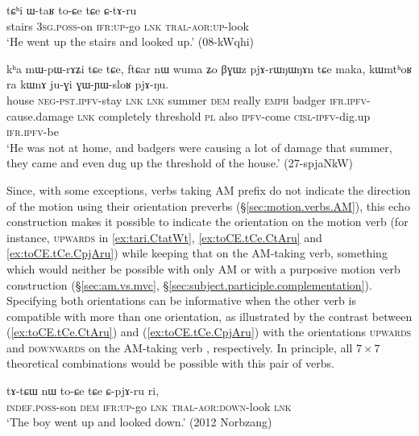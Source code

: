 \begin{exe}
\ex \label{ex:toCE.tCe.CtAru}
\gll tɕʰi ɯ-taʁ to-ɕe tɕe ɕ-tɤ-ru   \\
stairs \textsc{3sg}.\textsc{poss}-on \textsc{ifr}:\textsc{up}-go \textsc{lnk}  \textsc{tral}-\textsc{aor}:\textsc{up}-look \\
\glt `He went up the stairs and looked up.'  (08-kWqhi)
\end{exe}

\begin{exe}
\ex \label{ex:GWYWsloR}
\gll kʰa mɯ-pɯ-rɤʑi tɕe tɕe, ftɕar nɯ wuma ʑo βɣɯz pjɤ-rɯŋɯŋɤn tɕe maka, kɯmtʰoʁ ra kɯnɤ ju-ɣi ɣɯ-ɲɯ-sloʁ pjɤ-ŋu. \\
house \textsc{neg}-\textsc{pst}.\textsc{ipfv}-stay \textsc{lnk} \textsc{lnk} summer \textsc{dem} really \textsc{emph} badger \textsc{ifr}.\textsc{ipfv}-cause.damage \textsc{lnk} completely threshold \textsc{pl} also \textsc{ipfv}-come \textsc{cisl}-\textsc{ipfv}-dig.up \textsc{ifr}.\textsc{ipfv}-be \\
\glt `He was not at home, and badgers were causing a lot of damage that summer, they came and even dug up the threshold of the house.'  (27-spjaNkW)
\end{exe}

Since, with some exceptions, verbs taking AM prefix do not indicate the direction of the motion using their orientation preverbs (§\ref{sec:motion.verbs.AM}), this echo construction makes it possible to indicate the orientation on the motion verb (for instance, \textsc{upwards} in \ref{ex:tari.CtatWt}, \ref{ex:toCE.tCe.CtAru} and \ref{ex:toCE.tCe.CpjAru}) while keeping that on the AM-taking verb, something which would neither be possible with only AM or with a purposive motion verb construction (§\ref{sec:am.vs.mvc}, §\ref{sec:subject.participle.complementation}). Specifying both orientations can be informative when the other verb is compatible with more than one orientation, as illustrated by the contrast between (\ref{ex:toCE.tCe.CtAru}) and (\ref{ex:toCE.tCe.CpjAru}) with the orientations \textsc{upwards} and \textsc{downwards} on the AM-taking verb , respectively. In principle, all $7\times7$ theoretical combinations would be possible with this pair of verbs.

\begin{exe}
\ex \label{ex:toCE.tCe.CpjAru}
\gll tɤ-tɕɯ nɯ to-ɕe tɕe ɕ-pjɤ-ru ri, \\
\textsc{indef}.\textsc{poss}-son \textsc{dem} \textsc{ifr}:\textsc{up}-go \textsc{lnk}  \textsc{tral}-\textsc{aor}:\textsc{down}-look \textsc{lnk} \\
\glt `The boy went up and looked down.' (2012 Norbzang)
\end{exe}

